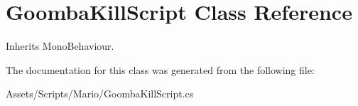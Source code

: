 \hypertarget{class_goomba_kill_script}{\section{Goomba\-Kill\-Script Class Reference}
\label{class_goomba_kill_script}
}


Inherits Mono\-Behaviour.



The documentation for this class was generated from the following file\-:\begin{DoxyCompactItemize}
\item 
Assets/\-Scripts/\-Mario/Goomba\-Kill\-Script.\-cs\end{DoxyCompactItemize}
